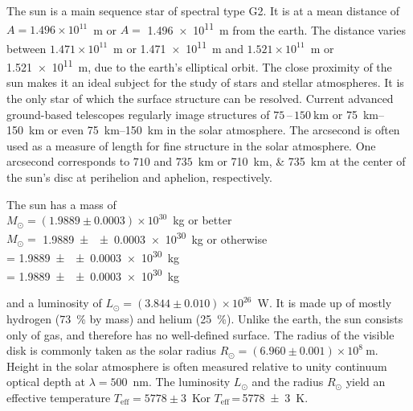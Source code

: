 The sun is a main sequence star of spectral type G2.
It is at a mean distance of $A=1.496\times10^{11}$~m or $A=$ \SI{1.496e11}{\meter} from the earth.
The distance varies between $1.471\times10^{11}$~m or \SI{1.471e11}{\meter} and $1.521\times10^{11}$~m or \SI{1.521e11}{\meter}, due to the earth's elliptical orbit.
The close proximity of the sun makes it an ideal subject for the study of stars and stellar atmospheres.
It is the only star of which the surface structure can be resolved.
Current advanced ground-based telescopes regularly image structures of $75$\,--\,$\SI{150}{\kilo\meter}$ or \SIrange{75}{150}{\kilo\metre} or even \SIrange[range-phrase = --,range-units=single]{75}{150}{\kilo\metre} in the solar atmosphere.
The arcsecond is often used as a measure of length for fine structure in the solar atmosphere.
One arcsecond corresponds to $710$ and $735$~km or \SIlist{710;735}{\kilo\metre} at the center of the sun's disc at perihelion and aphelion, respectively.

The sun has a mass of\\
$M_\odot=(1.9889\pm0.0003)\times10^{30}$~kg or better\\
$M_\odot=$ \SI[multi-part-units = brackets]{1.9889\pm\pm0.0003e30}{\kilogram} or otherwise\\
\si{\Msun} = \SI[multi-part-units = brackets]{1.9889\pm\pm0.0003e30}{\kilogram}\\
\si{\Msun} = \SI[separate-uncertainty = false]{1.9889\pm\pm0.0003e30}{\kilogram}

and a luminosity of $L_\odot=(3.844\pm0.010)\times10^{26}$~W\@.
It is made up of mostly hydrogen (\SI{73}{\percent} by mass) and helium (\SI{25}{\percent}).
Unlike the earth, the sun consists only of gas, and therefore has no well-defined surface.
The radius of the visible disk is commonly taken as the solar radius $R_\odot=(6.960\pm0.001)\times10^8~\mathrm{m}$.
Height in the solar atmosphere is often measured relative to unity continuum optical depth at $\lambda=500$~nm.
The luminosity $L_\odot$ and the radius $R_\odot$ yield an effective temperature $T_\mathrm{eff}=5778\pm3$~K\@ or $T_\mathrm{eff}$\,=\,\SI{5778\pm3}{\kelvin}\@.


